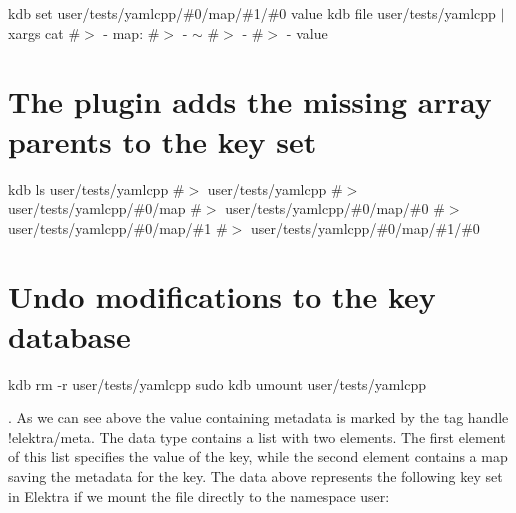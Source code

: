 kdb set user/tests/yamlcpp/\#0/map/\#1/\#0 value kdb file user/tests/yamlcpp $\vert$ xargs cat \#$>$ -\/ map\+: \#$>$ -\/ $\sim$ \#$>$ -\/ \#$>$ -\/ value\hypertarget{autotoc_md780_autotoc_md821}{}\section{The plugin adds the missing array parents to the key set}\label{autotoc_md780_autotoc_md821}
kdb ls user/tests/yamlcpp \#$>$ user/tests/yamlcpp \#$>$ user/tests/yamlcpp/\#0/map \#$>$ user/tests/yamlcpp/\#0/map/\#0 \#$>$ user/tests/yamlcpp/\#0/map/\#1 \#$>$ user/tests/yamlcpp/\#0/map/\#1/\#0\hypertarget{autotoc_md780_autotoc_md822}{}\section{Undo modifications to the key database}\label{autotoc_md780_autotoc_md822}
kdb rm -\/r user/tests/yamlcpp sudo kdb umount user/tests/yamlcpp 
\begin{DoxyCode}{0}
\DoxyCodeLine{}
\DoxyCodeLine{}
\end{DoxyCode}


. As we can see above the value containing metadata is marked by the tag handle {\ttfamily !elektra/meta}. The data type contains a list with two elements. The first element of this list specifies the value of the key, while the second element contains a map saving the metadata for the key. The data above represents the following key set in Elektra if we mount the file directly to the namespace {\ttfamily user}\+:


